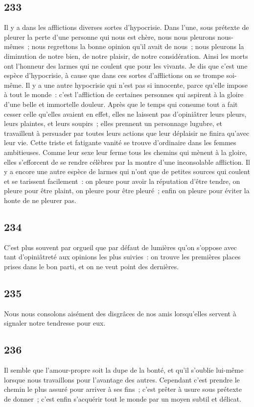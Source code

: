 \documentclass[french,twoside]{book} %
\begin{document}
\subsection[{233}]{ \textsc{233} }
\noindent Il y a dans les afflictions diverses sortes d’hypocrisie. Dans l’une, sous prétexte de pleurer la perte d’une personne qui nous est chère, nous nous pleurons nous-mêmes ; nous regrettons la bonne opinion qu’il avait de nous ; nous pleurons la diminution de notre bien, de notre plaisir, de notre considération. Ainsi les morts ont l’honneur des larmes qui ne coulent que pour les vivants. Je dis que c’est une espèce d’hypocrisie, à cause que dans ces sortes d’afflictions on se trompe soi-même. Il y a une autre hypocrisie qui n’est pas si innocente, parce qu’elle impose à tout le monde : c’est l’affliction de certaines personnes qui aspirent à la gloire d’une belle et immortelle douleur. Après que le temps qui consume tout a fait cesser celle qu’elles avaient en effet, elles ne laissent pas d’opiniâtrer leurs pleurs, leurs plaintes, et leurs soupirs ; elles prennent un personnage lugubre, et travaillent à persuader par toutes leurs actions que leur déplaisir ne finira qu’avec leur vie. Cette triste et fatigante vanité se trouve d’ordinaire dans les femmes ambitieuses. Comme leur sexe leur ferme tous les chemins qui mènent à la gloire, elles s’efforcent de se rendre célèbres par la montre d’une inconsolable affliction. Il y a encore une autre espèce de larmes qui n’ont que de petites sources qui coulent et se tarissent facilement : on pleure pour avoir la réputation d’être tendre, on pleure pour être plaint, on pleure pour être pleuré ; enfin on pleure pour éviter la honte de ne pleurer pas.
\subsection[{234}]{ \textsc{234} }
\noindent C’est plus souvent par orgueil que par défaut de lumières qu’on s’oppose avec tant d’opiniâtreté aux opinions les plus suivies : on trouve les premières places prises dans le bon parti, et on ne veut point des dernières.
\subsection[{235}]{ \textsc{235} }
\noindent Nous nous consolons aisément des disgrâces de nos amis lorsqu’elles servent à signaler notre tendresse pour eux.
\subsection[{236}]{ \textsc{236} }
\noindent Il semble que l’amour-propre soit la dupe de la bonté, et qu’il s’oublie lui-même lorsque nous travaillons pour l’avantage des autres. Cependant c’est prendre le chemin le plus assuré pour arriver à ses fins ; c’est prêter à usure sous prétexte de donner ; c’est enfin s’acquérir tout le monde par un moyen subtil et délicat.
\end{document}
